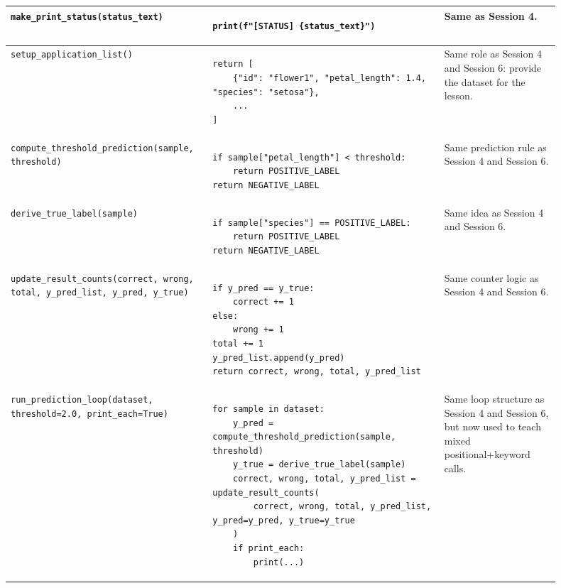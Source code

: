 \begin{landscape}
\begin{longtable}{|p{0.3\linewidth}|p{0.4\linewidth}|p{0.2\linewidth}|}
\texttt{make\_print\_status(status\_text)} & \begin{verbatim}
print(f"[STATUS] {status_text}")
\end{verbatim}
& Same as Session 4. \\
\hline
\texttt{setup\_application\_list()} & \begin{verbatim}
return [
    {"id": "flower1", "petal_length": 1.4, "species": "setosa"},
    ...
]
\end{verbatim}
& Same role as Session 4 and Session 6: provide the dataset for the lesson. \\
\hline
\texttt{compute\_threshold\_prediction(sample, threshold)} & \begin{verbatim}
if sample["petal_length"] < threshold:
    return POSITIVE_LABEL
return NEGATIVE_LABEL
\end{verbatim}
& Same prediction rule as Session 4 and Session 6. \\
\hline
\texttt{derive\_true\_label(sample)} & \begin{verbatim}
if sample["species"] == POSITIVE_LABEL:
    return POSITIVE_LABEL
return NEGATIVE_LABEL
\end{verbatim}
& Same idea as Session 4 and Session 6. \\
\hline
\texttt{update\_result\_counts(correct, wrong, total, y\_pred\_list, y\_pred, y\_true)} & \begin{verbatim}
if y_pred == y_true:
    correct += 1
else:
    wrong += 1
total += 1
y_pred_list.append(y_pred)
return correct, wrong, total, y_pred_list
\end{verbatim}
& Same counter logic as Session 4 and Session 6. \\
\hline
\texttt{run\_prediction\_loop(dataset, threshold=2.0, print\_each=True)} & \begin{verbatim}
for sample in dataset:
    y_pred = compute_threshold_prediction(sample, threshold)
    y_true = derive_true_label(sample)
    correct, wrong, total, y_pred_list = update_result_counts(
        correct, wrong, total, y_pred_list, y_pred=y_pred, y_true=y_true
    )
    if print_each:
        print(...)
\end{verbatim}
& Same loop structure as Session 4 and Session 6, but now used to teach mixed positional+keyword calls. \\

\end{longtable}
\end{landscape}
